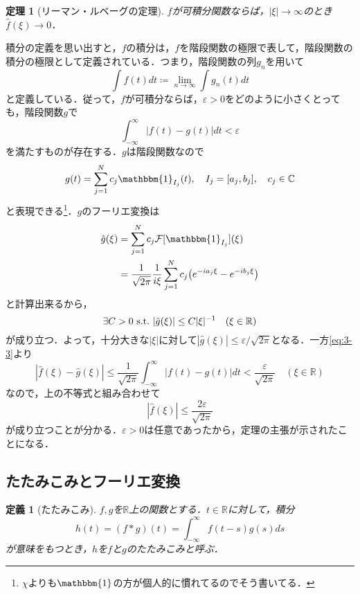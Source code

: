 \documentclass[dvipdfmx,a4j,10pt]{jsarticle}
\makeatletter
\theoremstyle{mystyle1}
\newtheorem{theorem}{定理}[section]
\theoremstyle{mystyle3}
\theoremstyle{mystyle4}
\theoremstyle{mystyle6}
\newtheorem{definition}{定義}[section]
\theoremstyle{mystyle2}
\theoremstyle{mystyle5}
\renewenvironment{proof}[1][\proofname]{\par
  \pushQED{\qed}%
  \normalfont
  \topsep6\p@\@plus6\p@ \trivlist
  \item[\hskip\labelsep{\bfseries\sffamily #1}]\ignorespaces
}{%
  \popQED\endtrivlist\@endpefalse
}
\renewcommand\proofname{証明}
\newenvironment{dfn}[1][]
{\begin{tcolorbox}[
    enhanced,
    boxrule=0pt,
    arc=0mm,
    frame hidden,
    borderline west={2pt}{-4pt}{green!60!black},
    breakable = true
    ]
    \begin{definition}[#1]
}
{\end{definition}\end{tcolorbox}}
\newenvironment{thm}[1][]
{\begin{tcolorbox}[
    enhanced,
    boxrule=0pt,
    arc=0mm,
    frame hidden,
    borderline west={2pt}{-4pt}{red},
    breakable = true
    ]
    \begin{theorem}[#1]
}
{\end{theorem}\end{tcolorbox}}
\makeatother
\begin{document}
\begin{thm}[リーマン・ルベーグの定理]\label{thm:3-12}
	$f$が可積分関数ならば，$|\xi|\to\infty$のとき$\hat f(\xi)\to 0$．
\end{thm}

\begin{proof}
	積分の定義を思い出すと，$f$の積分は，$f$を階段関数の極限で表して，階段関数の積分の極限として定義されている．つまり，階段関数の列$g_n$を用いて
	\[
		\int f(t)dt\coloneqq\lim_{n\to\infty}\int g_n(t)dt
	\]
	と定義している．従って，$f$が可積分ならば，$\varepsilon>0$をどのように小さくとっても，階段関数$g$で
	\begin{equation}\label{eq:3-3}
		\int_{-\infty}^\infty|f(t)-g(t)|dt<\varepsilon
	\end{equation}
	を満たすものが存在する．$g$は階段関数なので
	\[
		g(t)=\sum_{j=1}^N c_j\mathbbm{1}_{I_j}(t),\quad I_j=[a_j, b_j],\quad c_j\in\mathbb{C}
	\]
	と表現できる\footnote{$\chi$よりも$\mathbbm{1}$の方が個人的に慣れてるのでそう書いてる．}．$g$のフーリエ変換は
	\[
		\begin{split}
			\hat{g}(\xi)&=\sum_{j=1}^N c_j\mathcal{F}[\mathbbm{1}_{I_j}](\xi) \\
			&=\frac{1}{\sqrt{2\pi}}\frac{1}{i\xi}\sum_{j=1}^N c_j\mleft(e^{-ia_j\xi}-e^{-ib_j\xi}\mright)
		\end{split}
	\]
	と計算出来るから，
	\[
		\exists C>0\ \mathrm{s.t.}\ \mleft|\hat{g}(\xi)\mright|\leq C|\xi|^{-1}\quad(\xi\in\mathbb{R})
	\]
	が成り立つ．よって，十分大きな$|\xi|$に対して$\displaystyle\left|\hat{g}(\xi)\right|\leq\varepsilon/\sqrt{2\pi}$となる．一方\eqref{eq:3-3}より
	\[
		\left|\hat{f}(\xi)-\hat{g}(\xi)\right|\leq\frac{1}{\sqrt{2\pi}}\int_{-\infty}^\infty|f(t)-g(t)|dt<\frac{\varepsilon}{\sqrt{2\pi}}\quad(\xi\in\mathbb{R})
	\]
	なので，上の不等式と組み合わせて
	\[
		\left|\hat{f}(\xi)\right|\leq\frac{2\varepsilon}{\sqrt{2\pi}}
	\]
	が成り立つことが分かる．$\varepsilon>0$は任意であったから，定理の主張が示されたことになる．
\end{proof}

\subsection{たたみこみとフーリエ変換}

\begin{dfn}[たたみこみ]\label{dfn:3-4}
	$f,g$を$\mathbb{R}$上の関数とする．$t\in\mathbb{R}$に対して，積分
	\[
		h(t)=(f*g)(t)=\int_{-\infty}^\infty f(t-s)g(s)ds
	\]
	が意味をもつとき，$h$を$f$と$g$のたたみこみと呼ぶ．
\end{dfn}
\end{document}
